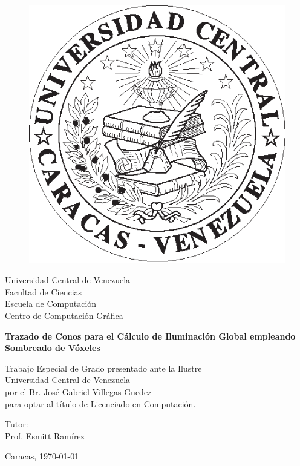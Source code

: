 \label{ch:portada}
\thispagestyle{empty}

\begin{figure}[t]
    \centering
    \includegraphics[height=0.15\textwidth]{media/logoucv.eps}
\end{figure}

\begin{center}
	Universidad Central de Venezuela\\
	Facultad de Ciencias\\
	Escuela de Computaci\'on\\
	Centro de Computaci\'on Gr\'afica\\
\end{center}
				
\vspace{2.5cm}

\begin{center}
	\large{\textbf{Trazado de Conos para el Cálculo de Iluminación Global empleando Sombreado de Vóxeles}}
\end{center}
				
\vspace{2.5cm}

\begin{center}
    Trabajo Especial de Grado presentado ante la Ilustre\\
    Universidad Central de Venezuela \\
    por el Br. José Gabriel Villegas Guedez\\
    para optar al título de Licenciado en Computación.
\end{center}

\vspace{2.5cm}				
				
\begin{center}
	Tutor:\\
	Prof. Esmitt Ramírez
\end{center}
				
\vspace{\fill}

\begin{center}
	Caracas, \monthyeardate\today
\end{center}				